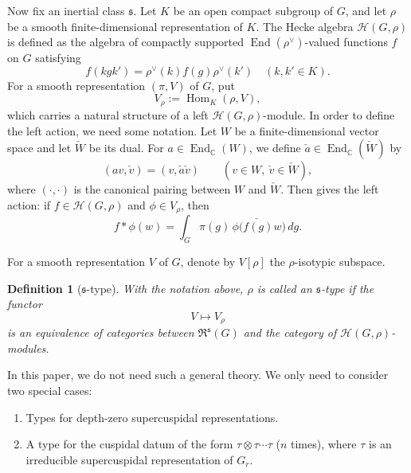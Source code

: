 \documentclass[12pt]{article}
\newtheorem{definition}[theorem]{Definition}
\theoremstyle{remark}
\begin{document}
Now fix an inertial class $\mathfrak{s}$. Let $K$ be an open compact subgroup of $G$, and let $\rho$ be a smooth finite-dimensional representation of $K$. The Hecke algebra $\mathcal{H}(G,\rho)$ is defined as the algebra of compactly supported $\operatorname{End}(\rho^\vee)$-valued functions $f$ on $G$ satisfying
$$
f(kgk') = \rho^\vee(k) f(g) \rho^\vee(k') \quad (k,k' \in K).
$$
For a smooth representation $(\pi, V)$ of $G$, put
$$
V_\rho := \operatorname{Hom}_K(\rho, V) ,
$$
which carries a natural structure of a left $\mathcal{H}(G,\rho)$-module. In order to define the left action, we need some notation. Let $W$ be a finite-dimensional vector space and let $\check{W}$ be its dual. For $a \in \operatorname{End}_{\mathbb{C}}(W)$, we define $\check{a} \in \operatorname{End}_{\mathbb{C}}(\check{W})$ by
$$
(a v, \check{v}) = (v, \check{a}\check{v}) \qquad (v \in W,\ \check{v} \in \check{W}),
$$
where $(\cdot,\cdot)$ is the canonical pairing between $W$ and $\check{W}$.
Then \cite[2.7]{BushnellKutzko1998} gives the left action: if $f \in \mathcal{H}(G,\rho)$ and $\phi \in V_\rho$, then
$$
f*\phi(w) = \int_G \pi(g)\,\phi\bigl(\check{f(g)} w\bigr)\, dg .
$$

For a smooth representation $V$ of $G$, denote by $V[\rho]$ the $\rho$-isotypic subspace.

\begin{definition}[$\mathfrak{s}$-type]
\label{def:s-type}
With the notation above, $\rho$ is called an \emph{$\mathfrak{s}$-type} if the functor
$$
V \longmapsto V_\rho
$$
is an equivalence of categories between $\mathfrak{R}^{\mathfrak{s}}(G)$ and the category of $\mathcal{H}(G,\rho)$-modules.
\end{definition}

In this paper, we do not need such a general theory. We only need to consider two special cases: 
\begin{enumerate}
\item Types for depth-zero supercuspidal representations.
\item A type for the cuspidal datum of the form $\tau \otimes \tau \cdots \tau$ ($n$ times), where $\tau$ is an irreducible supercuspidal representation of $G_r$.
\end{enumerate}
\end{document}

